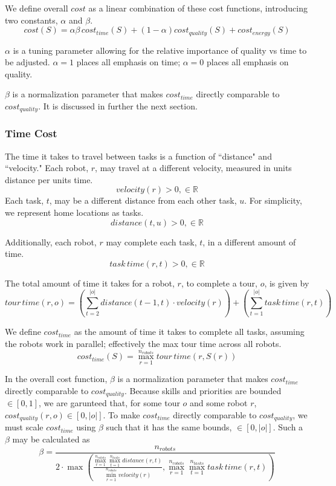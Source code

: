 \documentclass[a4paper]{article}
\begin{document}
We define overall $\mathit{cost}$ as a linear combination of these cost functions, introducing two constants, $\alpha$ and $\beta$.
$$
\mathit{cost}(S) =
  \alpha \beta \, \mathit{cost}_\mathit{time}(S) +
  (1-\alpha) \mathit{cost}_\mathit{quality}(S) +
  \mathit{cost}_\mathit{energy}(S)
$$

$\alpha$ is a tuning parameter allowing for the relative importance of quality vs time to be adjusted. $\alpha = 1$ places all emphasis on time; $\alpha = 0$ places all emphasis on quality.

$\beta$ is a normalization parameter that makes $\mathit{cost}_\mathit{time}$ directly comparable to $\mathit{cost}_\mathit{quality}$. It is discussed in further the next section.

\subsubsection{Time Cost}

The time it takes to travel between tasks is a function of ``distance" and ``velocity." Each robot, $r$, may travel at a different velocity, measured in units distance per units time.
$$\mathit{velocity}(r) > 0, \in \mathbb{R}$$
Each task, $t$, may be a different distance from each other task, $u$. For simplicity, we represent home locations as tasks.
$$\mathit{distance}(t, u) > 0, \in \mathbb{R}$$

Additionally, each robot, $r$ may complete each task, $t$, in a different amount of time.
$$\mathit{task \, time}(r, t) > 0, \in \mathbb{R}$$

The total amount of time it takes for a robot, $r$, to complete a tour, $o$, is given by
$$
\mathit{tour \, time}(r, o) =
  \left(
    \sum^{|o|}_{t=2} \mathit{distance}(t - 1, t) \cdot \mathit{velocity}(r)
  \right) +
  \left(
    \sum^{|o|}_{t=1} \mathit{task \, time}(r, t)
  \right)
$$

We define $\mathit{cost}_\mathit{time}$ as the amount of time it takes to complete all tasks, assuming the robots work in parallel; effectively the max tour time across all robots.
$$
\mathit{cost}_\mathit{time}(S) =
  \max_{r=1}^{n_\mathit{robots}}
  \mathit{tour \, time}(r, S(r))
$$

In the overall cost function, $\beta$ is a normalization parameter that makes $\mathit{cost}_\mathit{time}$ directly comparable to $\mathit{cost}_\mathit{quality}$. Because skills and priorities are bounded $\in [0, 1]$, we are garunteed that, for some tour $o$ and some robot $r$, $\mathit{cost}_\mathit{quality}(r, o) \in [0, |o|]$. To make $\mathit{cost}_\mathit{time}$ directly comparable to $\mathit{cost}_\mathit{quality}$, we must scale $\mathit{cost}_\mathit{time}$ using $\beta$ such that it has the same bounds, $\in [0, |o|]$. Such a $\beta$ may be calculated as
$$
\beta =
    \frac
      {n_\textit{robots}}
      {
        2 \cdot
        \max \left(
          \frac
            { \max\limits_{r=1}^{n_\mathit{robots}} \max\limits_{t=1}^{n_\mathit{tasks}} \mathit{distance}(r, t) }
            { \min\limits_{r=1}^{n_\mathit{robots}} \mathit{velocity}(r) },
          \max\limits_{r=1}^{n_\mathit{robots}} \max\limits_{t=1}^{n_\mathit{tasks}} \mathit{task \, time}(r, t)
        \right)
      }
$$
\end{document}
